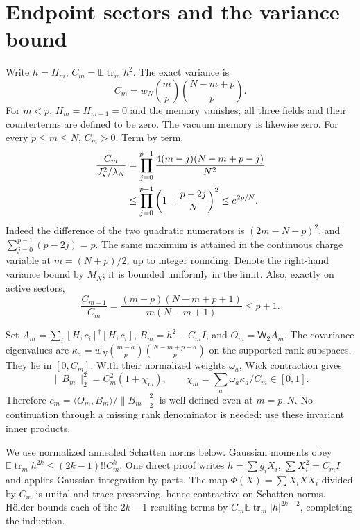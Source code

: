 \documentclass[11pt,a4paper]{article}
\newcommand{\EE}{\mathbb E}
\newcommand{\tr}{\operatorname{tr}}
\newcommand{\W}[1]{\mathsf W_{#1}}
\begin{document}
\newpage
\section{Endpoint sectors and the variance bound}
Write $h=H_m$, $C_m=\EE\tr_mh^2$. The exact variance is
\begin{equation}
 C_m=w_N\binom mp\binom{N-m+p}p.
\end{equation}
For $m<p$, $H_m=H_{m-1}=0$ and the memory vanishes; all three
fields and their counterterms are defined to be zero. The
vacuum memory is likewise zero. For every $p\le m\le N$,
$C_m>0$. Term by term,
\begin{align}
 \frac{C_m}{J_s^2/\lambda_N}
 &=\prod_{j=0}^{p-1}\frac{4(m-j)(N-m+p-j)}{N^2}\notag\\
 &\le\prod_{j=0}^{p-1}\left(1+\frac{p-2j}{N}\right)^2
 \le e^{2p/N}.\label{maxC}
\end{align}
Indeed the difference of the two quadratic numerators is
$(2m-N-p)^2$, and $\sum_{j=0}^{p-1}(p-2j)=p$.
The same maximum is attained in the continuous charge variable
at $m=(N+p)/2$, up to integer rounding. Denote the right-hand
variance bound by $M_N$; it is bounded uniformly in the limit.
Also, exactly on active sectors,
\begin{equation}
 \frac{C_{m-1}}{C_m}
 =\frac{(m-p)(N-m+p+1)}{m(N-m+1)}\le p+1.\label{adj}
\end{equation}

Set $A_m=\sum_i[H,c_i]^\dagger[H,c_i]$, $B_m=h^2-C_mI$,
and $O_m=\W2 A_m$. The covariance eigenvalues are
$\kappa_a=w_N\binom{m-a}p\binom{N-m+p-a}p$ on the supported
rank subspaces. They lie in $[0,C_m]$. With their normalized
weights $\omega_a$, Wick contraction gives
\begin{equation}
 \|B_m\|_2^2=C_m^2(1+\chi_m),\qquad
 \chi_m=\sum_a\omega_a\kappa_a/C_m\in[0,1].\label{denom}
\end{equation}
Therefore $c_m=\langle O_m,B_m\rangle/\|B_m\|_2^2$ is well
defined even at $m=p,N$. No continuation through a missing
rank denominator is needed: use these invariant inner products.

We use normalized annealed Schatten norms below. Gaussian moments
obey $\EE\tr_m h^{2k}\le(2k-1)!!C_m^k$. One direct proof writes
$h=\sum g_iX_i$, $\sum X_i^2=C_mI$ and applies Gaussian
integration by parts. The map $\Phi(X)=\sum X_iXX_i$ divided
by $C_m$ is unital and trace preserving, hence contractive on
Schatten norms. H\"older bounds each of the $2k-1$ resulting
terms by $C_m\EE\tr_m|h|^{2k-2}$, completing the induction.
\end{document}
